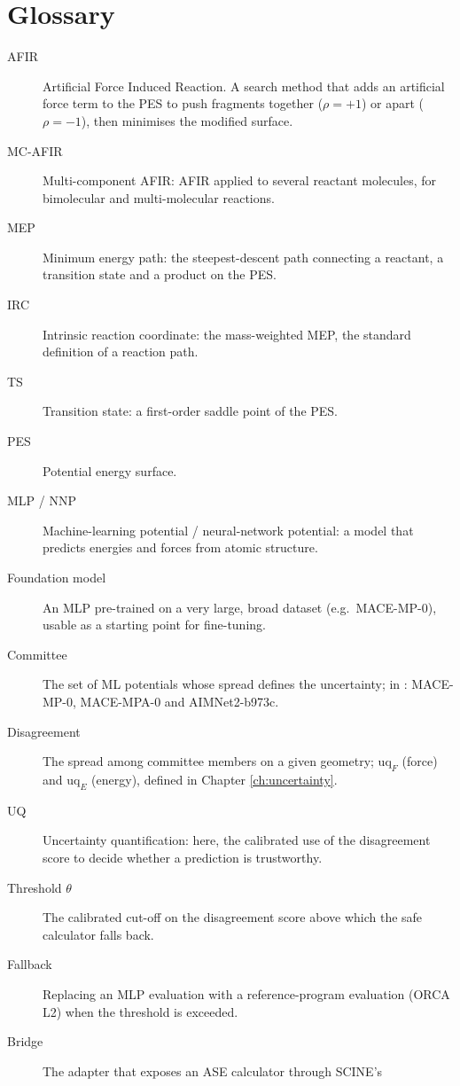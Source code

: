 \chapter{Glossary}
\label{app:glossary}

\begin{description}
  \item[AFIR] Artificial Force Induced Reaction.  A search method that adds
    an artificial force term to the PES to push fragments together
    ($\rho=+1$) or apart ($\rho=-1$), then minimises the modified surface.
  \item[MC-AFIR] Multi-component AFIR: AFIR applied to several reactant
    molecules, for bimolecular and multi-molecular reactions.
  \item[MEP] Minimum energy path: the steepest-descent path connecting a
    reactant, a transition state and a product on the PES.
  \item[IRC] Intrinsic reaction coordinate: the mass-weighted MEP, the
    standard definition of a reaction path.
  \item[TS] Transition state: a first-order saddle point of the PES.
  \item[PES] Potential energy surface.
  \item[MLP / NNP] Machine-learning potential / neural-network potential:
    a model that predicts energies and forces from atomic structure.
  \item[Foundation model] An MLP pre-trained on a very large, broad dataset
    (e.g.\ MACE-MP-0), usable as a starting point for fine-tuning.
  \item[Committee] The set of ML potentials whose spread defines the
    uncertainty; in \jns{}: MACE-MP-0, MACE-MPA-0 and AIMNet2-b973c.
  \item[Disagreement] The spread among committee members on a given
    geometry; $\mathrm{uq}_F$ (force) and $\mathrm{uq}_E$ (energy), defined
    in Chapter \ref{ch:uncertainty}.
  \item[UQ] Uncertainty quantification: here, the calibrated use of the
    disagreement score to decide whether a prediction is trustworthy.
  \item[Threshold $\theta$] The calibrated cut-off on the disagreement
    score above which the safe calculator falls back.
  \item[Fallback] Replacing an MLP evaluation with a reference-program
    evaluation (ORCA L2) when the threshold is exceeded.
  \item[Bridge] The adapter that exposes an ASE calculator through SCINE's

\end{description}
